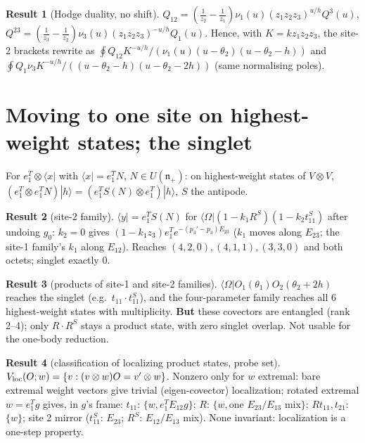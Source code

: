 \documentclass[11pt]{article}
\newcommand{\Om}{\langle\Omega|}
\theoremstyle{definition}
\newtheorem{result}{Result}
\theoremstyle{remark}
\begin{document}
\begin{result}[Hodge duality, no shift]
$Q_{12}=(\tfrac1{z_2}-\tfrac1{z_1})\nu_1(u)(z_1z_2z_3)^{u/h}Q^3(u)$, $Q^{23}=(\tfrac1{z_3}-\tfrac1{z_2})\nu_3(u)(z_1z_2z_3)^{-u/h}Q_1(u)$. Hence, with $K=kz_1z_2z_3$, the site-2 brackets rewrite as $\oint Q_{12}K^{-u/h}/(\nu_1(u)(u-\theta_2)(u-\theta_2-h))$ and $\oint Q_1\nu_3K^{-u/h}/((u-\theta_2-h)(u-\theta_2-2h))$ (same normalising poles).
\end{result}

\section{Moving to one site on highest-weight states; the singlet}

For $e_1^T\otimes\langle x|$ with $\langle x|=e_1^TN$, $N\in U(\mathfrak n_+)$: on highest-weight states of $V\otimes V$, $(e_1^T\otimes e_1^TN)|h\rangle=(e_1^TS(N)\otimes e_1^T)|h\rangle$, $S$ the antipode.

\begin{result}[site-2 family]
$\langle y|=e_1^TS(N)$ for $\Om(1-k_1R^S)(1-k_2t^S_{11})$ after undoing $g_0$: $k_2=0$ gives $(1-k_1z_3)e_1^Te^{-(p_3'-p_3)E_{23}}$ ($k_1$ moves along $E_{23}$; the site-1 family's $k_1$ along $E_{12}$). Reaches $(4,2,0),(4,1,1),(3,3,0)$ and both octets; singlet exactly $0$.
\end{result}

\begin{result}[products of site-1 and site-2 families]
$\Om O_1(\theta_1)O_2(\theta_2+2h)$ reaches the singlet (e.g.\ $t_{11}\cdot t^S_{11}$), and the four-parameter family reaches all 6 highest-weight states with multiplicity. \textbf{But} these covectors are entangled (rank 2--4); only $R\cdot R^S$ stays a product state, with zero singlet overlap. Not usable for the one-body reduction.
\end{result}

\begin{result}[classification of localizing product states, probe set]
$V_{\rm loc}(O;w)=\{v:(v\otimes w)O=v'\otimes w\}$. Nonzero only for $w$ extremal: bare extremal weight vectors give trivial (eigen-covector) localization; rotated extremal $w=e_1^Tg$ gives, in $g$'s frame: $t_{11}$: $\{w,e_1^TE_{12}g\}$; $R$: $\{w,\text{one }E_{23}/E_{13}\text{ mix}\}$; $Rt_{11},t_{21}$: $\{w\}$; site 2 mirror ($t^S_{11}$: $E_{23}$; $R^S$: $E_{12}/E_{13}$ mix). None invariant: localization is a one-step property.
\end{result}
\end{document}
